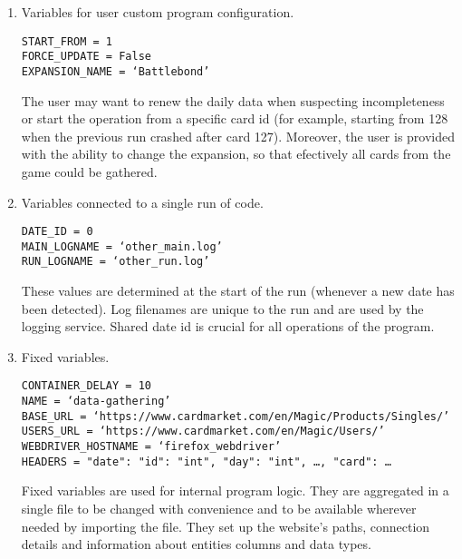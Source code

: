 \begin{enumerate}
    \item Variables for user custom program configuration. \par
          \texttt{START\_FROM = 1\\ FORCE\_UPDATE = False\\ EXPANSION\_NAME = `Battlebond'} \par
          The user may want to renew the daily data when suspecting incompleteness or start the operation from a specific card id (for example, starting from 128 when the previous run crashed after card 127). Moreover, the user is provided with the ability to change the expansion, so that efectively all cards from the game could be gathered.
    \item Variables connected to a single run of code. \par
          \texttt{DATE\_ID = 0\\ MAIN\_LOGNAME = `other\_main.log'\\ RUN\_LOGNAME = `other\_run.log'} \par
          These values are determined at the start of the run (whenever a new date has been detected). Log filenames are unique to the run and are used by the logging service. Shared date id is crucial for all operations of the program.
    \item Fixed variables. \par
          \texttt{CONTAINER\_DELAY = 10\\ NAME = `data-gathering'\\ BASE\_URL = `https://www.cardmarket.com/en/Magic/Products/Singles/'\\ USERS\_URL = `https://www.cardmarket.com/en/Magic/Users/'\\ WEBDRIVER\_HOSTNAME = `firefox\_webdriver'\\ HEADERS = \textbraceleft"date": \textbraceleft"id": "int", "day": "int", \dots\textbraceright, "card": \dots\textbraceright} \par
          Fixed variables are used for internal program logic. They are aggregated in a single file to be changed with convenience and to be available wherever needed by importing the file. They set up the website's paths, connection details and information about entities columns and data types.
\end{enumerate}


